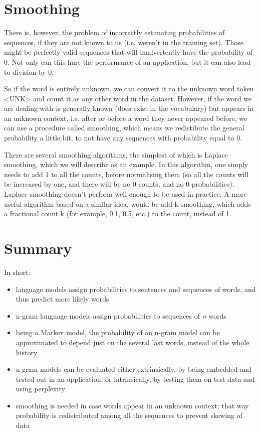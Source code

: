 \section{Smoothing}
There is, however, the problem of incorrectly estimating probabilities of sequences, if they are not known to us (i.e. weren't in the training set). Those might be perfectly valid sequences that will inadvertently have the probability of 0. Not only can this hurt the performance of an application, but it can also lead to division by 0.

So if the word is entirely unknown, we can convert it to the unknown word token <UNK> and count it as any other word in the dataset. However, if the word we are dealing with is generally known (does exist in the vocabulary) but appears in an unknown context, i.e. after or before a word they never appeared before, we can use a procedure called smoothing, which means we redistibute the general probability a little bit, to not have any sequences with probability equal to 0.

There are several smoothing algorithms, the simplest of which is Laplace smoothing, which we will describe as an example. In this algorithm, one simply needs to add 1 to all the counts, before normalising them (so all the counts will be increased by one, and there will be no 0 counts, and no 0 probabilities). Laplace smoothing doesn't perform well enough to be used in practice. A more useful algorithm based on a similar idea, would be add-k smoothing, which adds a fractional count k (for example, 0.1, 0.5, etc.) to the count, instead of 1.

\section{Summary}
In short:
\begin{itemize}
    \item language models assign probabilities to sentences and sequences of words, and thus predict more likely words
    \item n-gram language models assign probabilities to sequences of \textit{n} words
    \item being a Markov model, the probability of an n-gram model can be approximated to depend just on the several last words, instead of the whole history
    \item n-gram models can be evaluated either extrinsically, by being embedded and tested out in an application, or intrinsically, by testing them on test data and using perplexity
    \item smoothing is needed in case words appear in an unknown context; that way probability is redistributed among all the sequences to prevent skewing of data
\end{itemize}